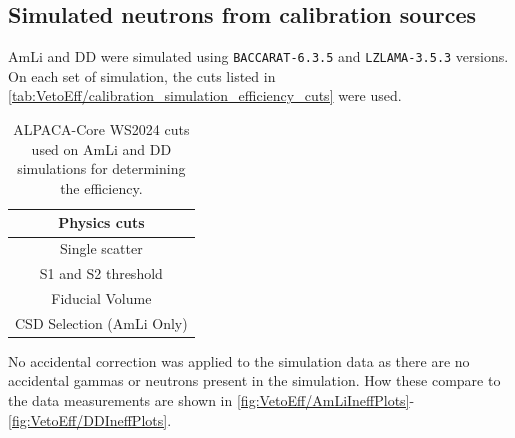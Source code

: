 \subsection{Simulated neutrons from calibration sources}
AmLi and DD were simulated using \lstinline{BACCARAT-6.3.5} and \lstinline{LZLAMA-3.5.3} versions.
On each set of simulation, the cuts listed in \autoref{tab:VetoEff/calibration_simulation_efficiency_cuts} were used.
\begin{table}[!ht]
	\centering
	\begin{tabular}{|c|}
    \hline
		\textbf{Physics cuts}              \\
		\hline
		Single scatter            \\
		S1 and S2 threshold       \\
		Fiducial Volume           \\
		CSD Selection (AmLi Only) \\
        \hline
	\end{tabular}
	\caption{ALPACA-Core WS2024 cuts used on AmLi and DD simulations for determining the efficiency.}
	\label{tab:VetoEff/calibration_simulation_efficiency_cuts}
\end{table}
No accidental correction was applied to the simulation data as there are no accidental gammas or neutrons present in the simulation.
How these compare to the data measurements are shown in \autoref{fig:VetoEff/AmLiIneffPlots}-\ref{fig:VetoEff/DDIneffPlots}.

